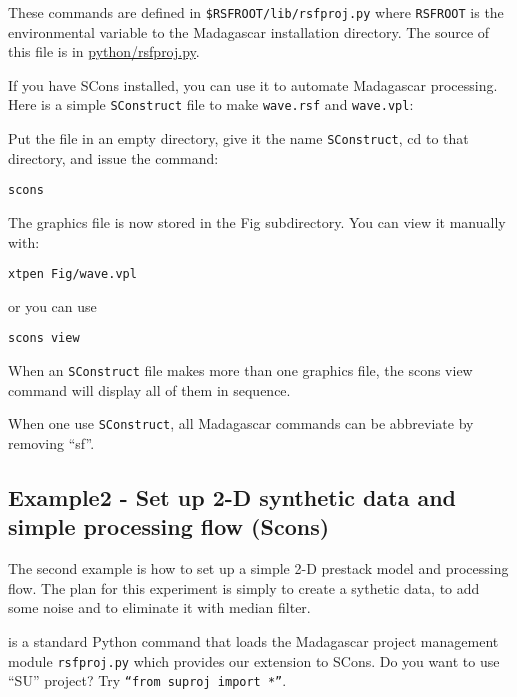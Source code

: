 \begin{enumerate}
These commands are defined in \texttt{\$RSFROOT/lib/rsfproj.py} where
\texttt{RSFROOT} is the environmental variable to the Madagascar
installation directory. The source of this file is in
\href{http://svn.sourceforge.net/viewvc/rsf/trunk/python/rsfproj.py?view=markup}{python/rsfproj.py}.
%

If you have SCons installed, you can use it to automate Madagascar
processing. Here is a simple \texttt{SConstruct} file to make
\texttt{wave.rsf} and
\texttt{wave.vpl}:


Put the file in an empty directory, give it the name
\texttt{SConstruct}, cd to that directory, and issue the command:
\begin{verbatim}
scons
\end{verbatim}
The graphics file is now stored in the Fig subdirectory. You can view it
manually with:
\begin{verbatim}
xtpen Fig/wave.vpl
\end{verbatim}
or you can use
\begin{verbatim}
scons view
\end{verbatim}
When an \texttt{SConstruct} file makes more than one graphics file, the scons
view command will display all of them in sequence. 

When one use \texttt{SConstruct}, all Madagascar commands can be abbreviate by
removing ``sf''.

\end{enumerate}

\subsection{Example2 - Set up 2-D synthetic data and simple processing flow (Scons) }

The second example is how to set up a simple 2-D prestack model and
processing flow.  The plan for this experiment is simply to create a
sythetic data, to add some noise and to eliminate it with median
filter.


%
is a standard Python command that loads the Madagascar project
management module \texttt{rsfproj.py} which provides our extension to
SCons. Do you want to use ``SU'' project? Try \texttt{``from suproj
import *''}.\\

